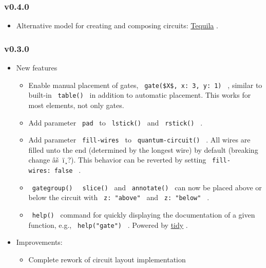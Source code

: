 \subsubsection{v0.4.0}\label{v0.4.0}

\begin{itemize}
\tightlist
\item
  Alternative model for creating and composing circuits:
  \href{https://github.com/typst/packages/raw/main/packages/preview/quill/0.5.0/\#tequila}{Tequila}
  .
\end{itemize}

\subsubsection{v0.3.0}\label{v0.3.0}

\begin{itemize}
\tightlist
\item
  New features

  \begin{itemize}
  \tightlist
  \item
    Enable manual placement of gates,
    \texttt{\ gate(\$X\$,\ x:\ 3,\ y:\ 1)\ } , similar to built-in
    \texttt{\ table()\ } in addition to automatic placement. This works
    for most elements, not only gates.
  \item
    Add parameter \texttt{\ pad\ } to \texttt{\ lstick()\ } and
    \texttt{\ rstick()\ } .
  \item
    Add parameter \texttt{\ fill-wires\ } to
    \texttt{\ quantum-circuit()\ } . All wires are filled unto the end
    (determined by the longest wire) by default (breaking change
    âš~ï¸?). This behavior can be reverted by setting
    \texttt{\ fill-wires:\ false\ } .
  \item
    \texttt{\ gategroup()\ } \texttt{\ slice()\ } and
    \texttt{\ annotate()\ } can now be placed above or below the circuit
    with \texttt{\ z:\ "above"\ } and \texttt{\ z:\ "below"\ } .
  \item
    \texttt{\ help()\ } command for quickly displaying the documentation
    of a given function, e.g., \texttt{\ help("gate")\ } . Powered by
    \href{https://github.com/Mc-Zen/tidy}{tidy} .
  \end{itemize}
\item
  Improvements:

  \begin{itemize}
  \tightlist
  \item
    Complete rework of circuit layout implementation


\end{itemize}
\end{itemize}
